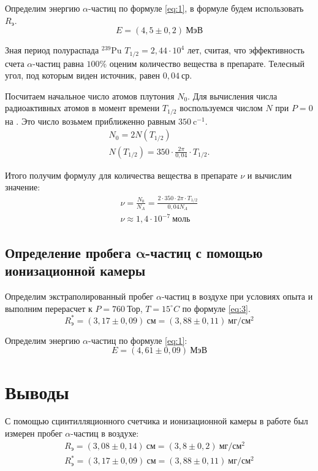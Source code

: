 \documentclass[a4paper, 12pt]{article}
\begin{document}
Определим энергию $\alpha$-частиц по формуле \eqref{eq:1}, в формуле
будем использовать $R_\text{э}$.
\[
    E = (4,5 \pm 0,2)\: \text{МэВ}
\]

Зная период полураспада $^{239} \text{Pu}$ $T_{1/2} = 2,44 \cdot 10^4$ лет,
считая, что эффективность счета $\alpha$-частиц равна $100\%$ оценим
количество вещества в препарате. Телесный угол, под которым виден
источник, равен $0,04\: \text{ср}$.


Посчитаем начальное число атомов плутония $N_0$. Для вычисления числа
радиоактивных атомов в момент времени $T _{1/2}$ воспользуемся числом
$N$ при $P = 0$ на . Это число возьмем приближенно равным
$350\: \text{c} ^{-1}$.
\begin{equation*}
    \begin{gathered}
        N_0 = 2 N(T _{1/2})\\
        N(T _{1/2}) = 350 \cdot \frac{2\pi}{0,04} \cdot T _{1/2}.
    \end{gathered}
\end{equation*}

Итого получим формулу для количества вещества в препарате $\nu$ и
вычислим значение:
\begin{equation*}
    \begin{gathered}
        \nu = \frac{N_0}{N_A} = \frac{2 \cdot 350 \cdot 2\pi \cdot T
        _{1/2}}{0,04 N_A}\\ 
        \nu \approx 1,4 \cdot 10 ^{-7}\: \text{моль}
    \end{gathered}
\end{equation*}


\subsection*{Определение пробега $\symbf{\alpha}$-частиц с помощью
ионизационной камеры}
Определим экстраполированный пробег $\alpha$-частиц в воздухе при
условиях опыта и выполним перерасчет к $P = 760\: \text{Тор}$, $T = 15
^{\circ} C$ по формуле \eqref{eq:3}. 
\[
    R^*_\text{э} = (3,17 \pm 0,09)\: \text{см} = (3,88 \pm 0,11)\:
    \text{мг}/\text{см}^2
\]

Определим энергию $\alpha$-частиц по формуле \eqref{eq:1}:
\[
    E = (4,61 \pm 0,09)\: \text{МэВ}
\]












\section{Выводы}
С помощью сцинтилляционного счетчика и ионизационной камеры в работе
был измерен пробег $\alpha$-частиц в воздухе:
\begin{equation*}
    \begin{gathered}
        R_\text{э} =  (3,08 \pm 0,14)\: \text{см} = (3,8 \pm 0,2)\:
         \text{мг}/\text{см}^2\\
    R^*_\text{э} = (3,17 \pm 0,09)\: \text{см} = (3,88 \pm 0,11)\:
    \text{мг}/\text{см}^2
    \end{gathered}
\end{equation*}
\end{document}
